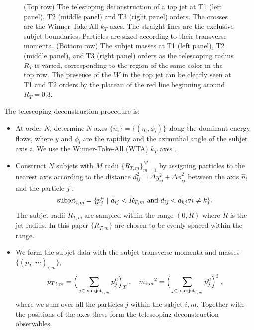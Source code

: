 \documentclass[notoc]{JHEP3}
\begin{document}
\begin{figure}[t]
\caption{\label{fig:tjet}(Top row) The telescoping deconstruction of a top jet at T1 (left panel), T2 (middle panel) and T3 (right panel) orders. The crosses are the Winner-Take-All $k_T$ axes. The straight lines are the exclusive subjet boundaries. Particles are sized according to their transverse momenta. (Bottom row) The subjet masses at T1 (left panel), T2 (middle panel), and T3 (right panel) orders as the telescoping radius $R_T$ is varied, corresponding to the region of the same color in the top row. The presence of the $W$ in the top jet can be clearly seen at T1 and T2 orders by the plateau of the red line beginning around $R_T=0.3$.}
\end{figure}

The telescoping deconstruction procedure is:
\begin{itemize}
        \item At order $N$, determine $N$ axes $\{\hat n_i\}=\{(\eta_i,\phi_i)\}$ along the dominant energy flows, where $y$ and $\phi_i$ are the rapidity and the azimuthal angle of the subjet axis $i$. We use the Winner-Take-All (WTA) $k_T$ axes \cite{Thaler:2010tr}.
        \item Construct $N$ subjets with $M$ radii $\{R_{T,m}\}^M_{m=1}$ by assigning particles to the nearest axis according to the distance $d^2_{ij} = \Delta y_{ij}^2+\Delta \phi_{ij}^2$ between the axis $\hat n_i$ and the particle $j$ \cite{Stewart:2010tn,Chien:2013kca,Stewart:2015waa,Thaler:2015xaa}.
            \begin{equation}
                {\rm subjet}_{i,m} = \{p^\mu_j~|~d_{ij}<R_{T,m}~{\rm and}~d_{ij}<d_{kj} \forall i\neq k\}.
            \end{equation}
            The subjet radii ${R_{T,m}}$ are sampled within the range $(0,R)$ where $R$ is the jet radius. In this paper $\{R_{T,m}\}$ are chosen to be evenly spaced within the range.
        \item We form the subjet data with the subjet transverse momenta and masses $\{(p_T,m)_{i,m}\}$,
            \begin{equation}
                {p_T}_{i,m}=\Big(\sum_{j\in~{\rm subjet}_{i,m}}p^\mu_j\Big)_T\;,~~~{m_{i,m}}^2=\Big(\sum_{j\in~{\rm subjet}_{i,m}}p^\mu_j\Big)^2\;,
            \end{equation}
            where we sum over all the particles $j$ within the subjet $i,m$. Together with the positions of the axes these form the telescoping deconstruction observables.
    \end{itemize}
\end{document}
